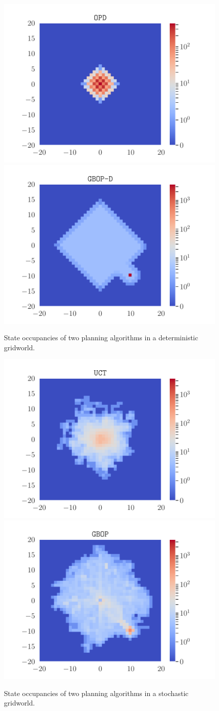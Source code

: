 \documentclass[runningheads]{llncs}
\begin{document}
\begin{figure}[ht]
	\centering
	\includegraphics[trim={1.8cm 0.7cm 1.8cm 0.7cm}, clip, width=0.4\linewidth]{img/occupations_OPD.pdf}
	\includegraphics[trim={1.8cm 0.7cm 1.8cm 0.7cm}, clip, width=0.4\linewidth]{img/occupations_GBOP-D.pdf}
	\caption{State occupancies of two planning algorithms in a deterministic gridworld.}
	\label{fig:deterministic-gridworld}
\end{figure}
\begin{figure}[ht]
	\centering
	\includegraphics[trim={1.8cm 0.7cm 1.8cm 0.7cm}, clip, width=0.4\linewidth]{img/occupations_UCT.pdf}
	\includegraphics[trim={1.8cm 0.7cm 1.8cm 0.7cm}, clip, width=0.4\linewidth]{img/occupations_GBOP.pdf}
	\caption{State occupancies of two planning algorithms in a stochastic gridworld.}
	\label{fig:stochastic-gridworld}
\end{figure}
\end{document}
